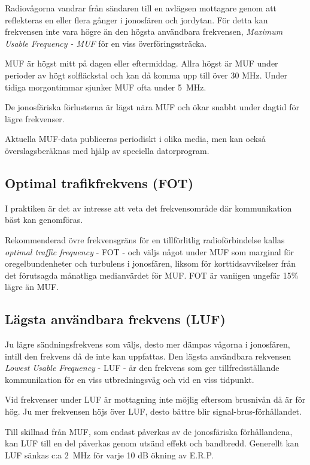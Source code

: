 Radiovågorna vandrar från sändaren till en avlägsen mottagare genom
att reflekteras en eller flera gånger i jonosfären och jordytan. För
detta kan frekvensen inte vara högre än den högsta användbara
frekvensen, \emph{Maximum Usable Frequency - MUF} för en viss
överföringssträcka.

MUF är högst mitt på dagen eller eftermiddag. Allra högst är MUF under
perioder av högt solfläckstal och kan då komma upp till över 30
MHz. Under tidiga morgontimmar sjunker MUF ofta under 5~MHz.

De jonosfäriska förlusterna är lägst nära MUF och ökar snabbt under
dagtid för lägre frekvenser.

Aktuella MUF-data publiceras periodiskt i olika media, men kan också
överslagsberäknas med hjälp av speciella datorprogram.

\subsection{Optimal trafikfrekvens (FOT)}

I praktiken är det av intresse att veta det frekvensområde där
kommunikation bäst kan genomföras.

Rekommenderad övre frekvensgräns för en tillförlitlig radioförbindelse
kallas \emph{optimal traffic frequency} - FOT - och väljs något under
MUF som marginal för oregelbundenheter och turbulens i jonosfären,
liksom för korttidsavvikelser från det förutsagda månatliga
medianvärdet för MUF. FOT är vaniigen ungefär 15\% lägre än MUF.

\subsection{Lägsta användbara frekvens (LUF)}

Ju lägre sändningsfrekvens som väljs, desto mer dämpas vågorna i
jonosfären, intill den frekvens då de inte kan uppfattas. Den lägsta
användbara rekvensen \emph{Lowest Usable Frequency} - LUF - är den
frekvens som ger tillfredsställande kommunikation för en viss
utbredningsväg och vid en viss tidpunkt.

Vid frekvenser under LUF är mottagning inte möjlig eftersom brusnivån
då är för hög.  Ju mer frekvensen höjs över LUF, desto bättre blir
signal-brus-förhållandet.

Till skillnad från MUF, som endast påverkas av de jonosfäriska
förhållandena, kan LUF till en del påverkas genom utsänd effekt och
bandbredd. Generellt kan LUF sänkas c:a 2~MHz för varje 10 dB ökning
av E.R.P.

